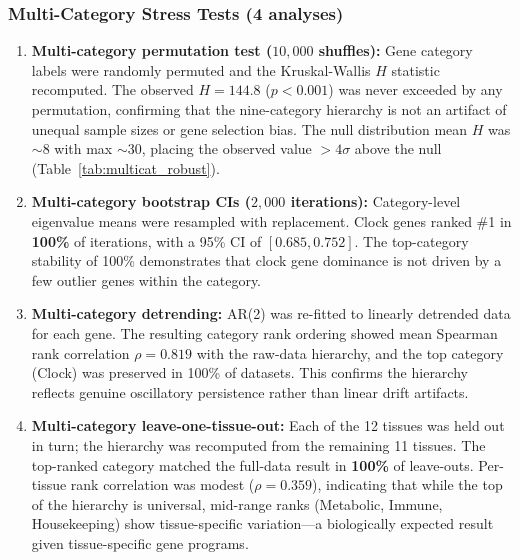 \documentclass[11pt,letterpaper]{article}
\begin{document}
\subsubsection*{Multi-Category Stress Tests (4 analyses)}

\begin{enumerate}[noitemsep, start=8]
    \item \textbf{Multi-category permutation test ($10{,}000$ shuffles):} Gene category labels were randomly permuted and the Kruskal-Wallis $H$ statistic recomputed. The observed $H = 144.8$ ($p < 0.001$) was never exceeded by any permutation, confirming that the nine-category hierarchy is not an artifact of unequal sample sizes or gene selection bias. The null distribution mean $H$ was $\sim$8 with max $\sim$30, placing the observed value $>4\sigma$ above the null (Table~\ref{tab:multicat_robust}).

    \item \textbf{Multi-category bootstrap CIs ($2{,}000$ iterations):} Category-level eigenvalue means were resampled with replacement. Clock genes ranked \#1 in \textbf{100\%} of iterations, with a 95\% CI of $[0.685, 0.752]$. The top-category stability of 100\% demonstrates that clock gene dominance is not driven by a few outlier genes within the category.

    \item \textbf{Multi-category detrending:} AR(2) was re-fitted to linearly detrended data for each gene. The resulting category rank ordering showed mean Spearman rank correlation $\rho = 0.819$ with the raw-data hierarchy, and the top category (Clock) was preserved in 100\% of datasets. This confirms the hierarchy reflects genuine oscillatory persistence rather than linear drift artifacts.

    \item \textbf{Multi-category leave-one-tissue-out:} Each of the 12 tissues was held out in turn; the hierarchy was recomputed from the remaining 11 tissues. The top-ranked category matched the full-data result in \textbf{100\%} of leave-outs. Per-tissue rank correlation was modest ($\rho = 0.359$), indicating that while the top of the hierarchy is universal, mid-range ranks (Metabolic, Immune, Housekeeping) show tissue-specific variation---a biologically expected result given tissue-specific gene programs.
\end{enumerate}
\end{document}
